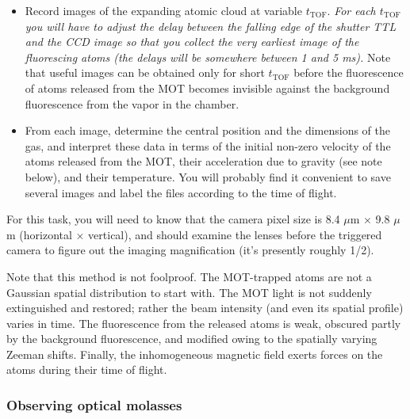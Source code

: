 \documentclass{../lab}
\begin{document}
\begin{itemize}
    \item Record images of the expanding atomic cloud at variable $t_\text{TOF}$. \emph{For each $t_\text{TOF}$ you will have to adjust the delay between the falling edge of the shutter TTL and the CCD image so that you collect the very earliest image of the fluorescing atoms (the delays will be somewhere between 1 and 5 ms).} Note that useful images can be obtained only for short $t_\text{TOF}$ before the fluorescence of atoms released from the MOT becomes invisible against the background fluorescence from the vapor in the chamber.

    \item From each image, determine the central position and the dimensions of the gas, and interpret these data in terms of the initial non-zero velocity of the atoms released from the MOT, their acceleration due to gravity (see note below), and their temperature. You will probably find it convenient to save several images and label the files according to the time of flight.
\end{itemize}

For this task, you will need to know that the camera pixel size is 8.4 $\mu$m $\times$ 9.8 $\mu$m (horizontal $\times$ vertical), and should examine the lenses before the triggered camera to figure out the imaging magnification (it's presently roughly 1/2).

Note that this method is not foolproof. The MOT-trapped atoms are not a Gaussian spatial distribution to start with. The MOT light is not suddenly extinguished and restored; rather the beam intensity (and even its spatial profile) varies in time. The fluorescence from the released atoms is weak, obscured partly by the background fluorescence, and modified owing to the spatially varying Zeeman shifts. Finally, the inhomogeneous magnetic field exerts forces on the atoms during their time of flight.



\subsubsection{Observing optical molasses}
\end{document}
